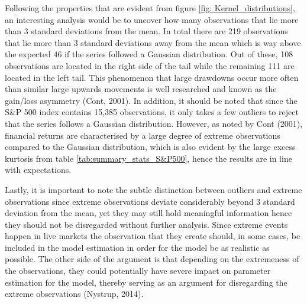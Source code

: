Following the properties that are evident from figure \ref{fig: Kernel_distributions}, an interesting analysis would be to uncover how many observations that lie more than 3 standard deviations from the mean. In total there are 219 observations that lie more than 3 standard deviations away from the mean which is way above the expected 46 if the series followed a Gaussian distribution. Out of these, 108 observations are located in the right side of the tail while the remaining 111 are located in the left tail. This phenomenon that large drawdowns occur more often than similar large upwards movements is well researched and known as the gain/loss asymmetry (Cont, 2001). In addition, it should be noted that since the S\&P 500 index contains 15,385 observations, it only takes a few outliers to reject that the series follows a Gaussian distribution. However, as noted by Cont (2001), financial returns are characterised by a large degree of extreme observations compared to the Gaussian distribution, which is also evident by the large excess kurtosis from table \ref{tab:summary_stats_S&P500}, hence the results are in line with expectations.

Lastly, it is important to note the subtle distinction between outliers and extreme observations since extreme observations deviate considerably beyond 3 standard deviation from the mean, yet they may still hold meaningful information hence they should not be disregarded without further analysis.
Since extreme events happen in live markets the observation that they create should, in some cases, be included in the model estimation in order for the model be as realistic as possible. The other side of the argument is that depending on the extremeness of the observations, they could potentially have severe impact on parameter estimation for the model, thereby serving as an argument for disregarding the extreme observations (Nystrup, 2014). 


\label{subsection: distributional properties}

